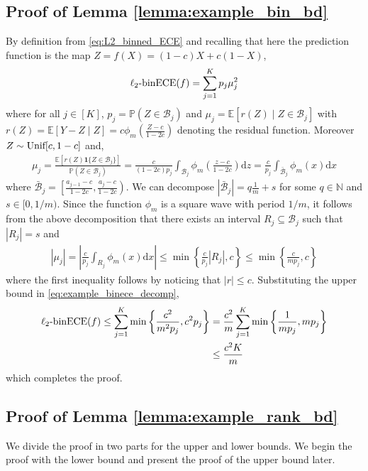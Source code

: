 \documentclass[11pt]{article}
\numberwithin{equation}{section}
\theoremstyle{definition}
\newcommand{\E}{\mathbb{E}}
\renewcommand{\P}{\mathbb{P}}
\newcommand{\N}{\mathbb{N}}
\newcommand{\cB}{\mathcal{B}}
\newcommand{\one}{\bm{1}}
\newcommand{\binECE}{\mathrm{binECE}}
\newcommand{\lbinECE}{\ell_2\textnormal{-}\binECE}
\newcommand{\rmd}{\mathrm{d}}
\begin{document}
\subsection{Proof of Lemma \ref{lemma:example_bin_bd}}\label{sec:proofof_lemma_example_bin_bd}
By definition from \eqref{eq:L2_binned_ECE} and recalling that here the prediction function is the map $Z = f(X) = (1-c)X + c(1-X)$,
\begin{align}\label{eq:example_binece_decomp}
\lbinECE(f) = \sum_{j=1}^{K}p_j\mu_j^2
\end{align}
where for all $j\in [K]$, $p_j = \P(Z\in \cB_j)$ and $\mu_j = \E[r(Z)\mid Z\in \cB_j]$ with $r(Z) = \E[Y-Z\mid Z] = c\phi_m\left(\frac{Z-c}{1-2c}\right)$ denoting the residual function. Moreover $Z\sim \textnormal{Unif}[c,1-c]$ and,
\begin{align*}
\mu_j = \frac{\E\left[r(Z)\one\{Z\in \cB_j\}\right]}{\P(Z\in \cB_j)} = \frac{c}{(1-2c)p_j}\int_{\cB_j}\phi_m\left(\frac{z-c}{1-2c}\right)\rmd z = \frac{c}{p_j}\int_{\bar{\cB}_j}\phi_m(x)\rmd x
\end{align*}
where $\bar{\cB}_j = \left[\frac{a_{j-1} - c}{1-2c}, \frac{a_j-c}{1-2c}\right)$. We can decompose $|\bar{\cB}_j| = q\frac{1}{m} + s$ for some $q\in\N$ and $s\in [0, 1/m)$. Since the function $\phi_m$ is a square wave with period $1/m$, it follows from the above decomposition that there exists an interval $R_j\subseteq \cB_j$ such that $|R_j| = s$ and
\begin{align*}
|\mu_j| = \left|\frac{c}{p_j}\int_{R_j}\phi_m(x)\rmd x\right|\leq \min\left\{\frac{c}{p_j}|R_j|, c\right\}\leq \min\left\{\frac{c}{mp_j}, c\right\}
\end{align*}
where the first inequality follows by noticing that $|r|\leq c$. Substituting the upper bound in \eqref{eq:example_binece_decomp},
\begin{align*}
    \lbinECE(f)\leq \sum_{j=1}^{K}\min\left\{\frac{c^2}{m^2p_j}, c^2p_j\right\} 
    & = \frac{c^2}{m}\sum_{j=1}^{K}\min\left\{\frac{1}{mp_j}, mp_j\right\}\\
    &\leq \frac{c^2K}{m}
\end{align*}
which completes the proof.


\subsection{Proof of Lemma \ref{lemma:example_rank_bd}}\label{appendix:proofof_lemma_example_rank_bd}
We divide the proof in two parts for the upper and lower bounds. We begin the proof with the lower bound and present the proof of the upper bound later. 
\end{document}
